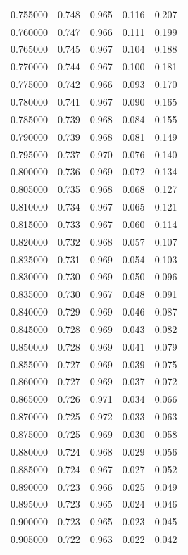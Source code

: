 \begin{table}[htbp]
\begin{tabular}{lllll}
0.755000 & 0.748 & 0.965 & 0.116 & 0.207 \\
0.760000 & 0.747 & 0.966 & 0.111 & 0.199 \\
0.765000 & 0.745 & 0.967 & 0.104 & 0.188 \\
0.770000 & 0.744 & 0.967 & 0.100 & 0.181 \\
0.775000 & 0.742 & 0.966 & 0.093 & 0.170 \\
0.780000 & 0.741 & 0.967 & 0.090 & 0.165 \\
0.785000 & 0.739 & 0.968 & 0.084 & 0.155 \\
0.790000 & 0.739 & 0.968 & 0.081 & 0.149 \\
0.795000 & 0.737 & 0.970 & 0.076 & 0.140 \\
0.800000 & 0.736 & 0.969 & 0.072 & 0.134 \\
0.805000 & 0.735 & 0.968 & 0.068 & 0.127 \\
0.810000 & 0.734 & 0.967 & 0.065 & 0.121 \\
0.815000 & 0.733 & 0.967 & 0.060 & 0.114 \\
0.820000 & 0.732 & 0.968 & 0.057 & 0.107 \\
0.825000 & 0.731 & 0.969 & 0.054 & 0.103 \\
0.830000 & 0.730 & 0.969 & 0.050 & 0.096 \\
0.835000 & 0.730 & 0.967 & 0.048 & 0.091 \\
0.840000 & 0.729 & 0.969 & 0.046 & 0.087 \\
0.845000 & 0.728 & 0.969 & 0.043 & 0.082 \\
0.850000 & 0.728 & 0.969 & 0.041 & 0.079 \\
0.855000 & 0.727 & 0.969 & 0.039 & 0.075 \\
0.860000 & 0.727 & 0.969 & 0.037 & 0.072 \\
0.865000 & 0.726 & 0.971 & 0.034 & 0.066 \\
0.870000 & 0.725 & 0.972 & 0.033 & 0.063 \\
0.875000 & 0.725 & 0.969 & 0.030 & 0.058 \\
0.880000 & 0.724 & 0.968 & 0.029 & 0.056 \\
0.885000 & 0.724 & 0.967 & 0.027 & 0.052 \\
0.890000 & 0.723 & 0.966 & 0.025 & 0.049 \\
0.895000 & 0.723 & 0.965 & 0.024 & 0.046 \\
0.900000 & 0.723 & 0.965 & 0.023 & 0.045 \\
0.905000 & 0.722 & 0.963 & 0.022 & 0.042 \\

\end{tabular}
\end{table}
